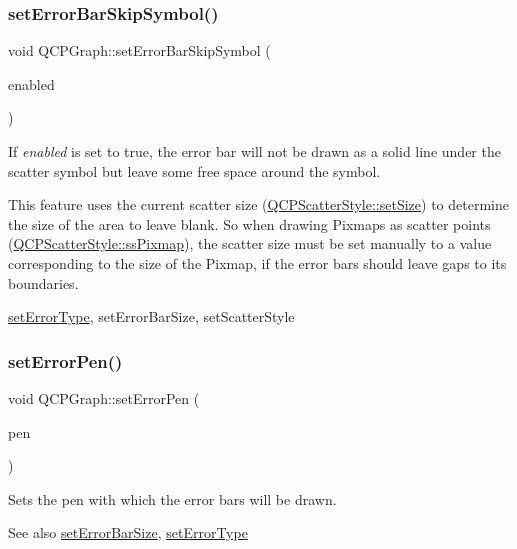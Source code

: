 \subsubsection{\texorpdfstring{set\+Error\+Bar\+Skip\+Symbol()}{setErrorBarSkipSymbol()}}
{\footnotesize\ttfamily void Q\+C\+P\+Graph\+::set\+Error\+Bar\+Skip\+Symbol (\begin{DoxyParamCaption}\item[{bool}]{enabled }\end{DoxyParamCaption})}

If {\itshape enabled} is set to true, the error bar will not be drawn as a solid line under the scatter symbol but leave some free space around the symbol.

This feature uses the current scatter size (\mbox{\hyperlink{class_q_c_p_scatter_style_aaefdd031052892c4136129db68596e0f}{Q\+C\+P\+Scatter\+Style\+::set\+Size}}) to determine the size of the area to leave blank. So when drawing Pixmaps as scatter points (\mbox{\hyperlink{class_q_c_p_scatter_style_adb31525af6b680e6f1b7472e43859349a8718b849ca7c307b07b8e091efb0c31e}{Q\+C\+P\+Scatter\+Style\+::ss\+Pixmap}}), the scatter size must be set manually to a value corresponding to the size of the Pixmap, if the error bars should leave gaps to its boundaries.

\mbox{\hyperlink{class_q_c_p_graph_ac3614d799c3894f2bc646e99c7f73d38}{set\+Error\+Type}}, set\+Error\+Bar\+Size, set\+Scatter\+Style \mbox{\label{class_q_c_p_graph_abd4c7f81939e10776ea64603a704f22a}} 
\subsubsection{\texorpdfstring{set\+Error\+Pen()}{setErrorPen()}}
{\footnotesize\ttfamily void Q\+C\+P\+Graph\+::set\+Error\+Pen (\begin{DoxyParamCaption}\item[{const Q\+Pen \&}]{pen }\end{DoxyParamCaption})}

Sets the pen with which the error bars will be drawn. \begin{DoxySeeAlso}{See also}
\mbox{\hyperlink{class_q_c_p_graph_a10f50c5495ce45ef559ec2066194a335}{set\+Error\+Bar\+Size}}, \mbox{\hyperlink{class_q_c_p_graph_ac3614d799c3894f2bc646e99c7f73d38}{set\+Error\+Type}} 
\end{DoxySeeAlso}
\mbox{\label{class_q_c_p_graph_ac3614d799c3894f2bc646e99c7f73d38}} 
